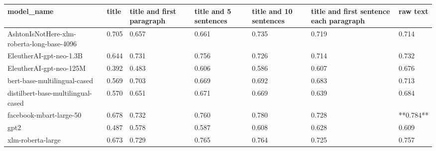 \begin{tabular}{lllllll}
\toprule
                                model\_name & title & title and first paragraph & title and 5 sentences & title and 10 sentences & title and first sentence each paragraph &  raw text \\
\midrule
AshtonIsNotHere-xlm-roberta-long-base-4096 & 0.705 &                     0.657 &                 0.661 &                  0.735 &                                   0.719 &     0.714 \\
                   EleutherAI-gpt-neo-1.3B & 0.644 &                     0.731 &                 0.756 &                  0.726 &                                   0.714 &     0.732 \\
                   EleutherAI-gpt-neo-125M & 0.392 &                     0.483 &                 0.606 &                  0.586 &                                   0.607 &     0.676 \\
              bert-base-multilingual-cased & 0.569 &                     0.703 &                 0.669 &                  0.692 &                                   0.683 &     0.713 \\
        distilbert-base-multilingual-cased & 0.570 &                     0.651 &                 0.671 &                  0.669 &                                   0.639 &     0.684 \\
                   facebook-mbart-large-50 & 0.678 &                     0.732 &                 0.760 &                  0.780 &                                   0.728 & **0.784** \\
                                      gpt2 & 0.487 &                     0.578 &                 0.587 &                  0.608 &                                   0.628 &     0.609 \\
                         xlm-roberta-large & 0.673 &                     0.729 &                 0.765 &                  0.764 &                                   0.725 &     0.757 \\
\bottomrule
\end{tabular}
